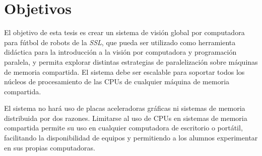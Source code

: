 
\section{Objetivos}

\label{objetivos}

El objetivo de esta tesis es crear un sistema de visión global por computadora
para fútbol de robots de la \emph{SSL}, que pueda ser utilizado como herramienta
didáctica para la introducción a la visión por computadora y programación
paralela, y permita explorar distintas estrategias de paralelización sobre
máquinas de memoria compartida. El sistema debe ser escalable para soportar
todos los núcleos de procesamiento de las CPUs de cualquier máquina de memoria
compartida.

El sistema no hará uso de placas aceleradoras gráficas ni sistemas de memoria
distribuida por dos razones. Limitarse al uso de CPUs en sistemas de memoria
compartida permite su uso en cualquier computadora de escritorio o portátil,
facilitando la disponibilidad de equipos y permitiendo a los alumnos
experimentar en sus propias computadoras.
